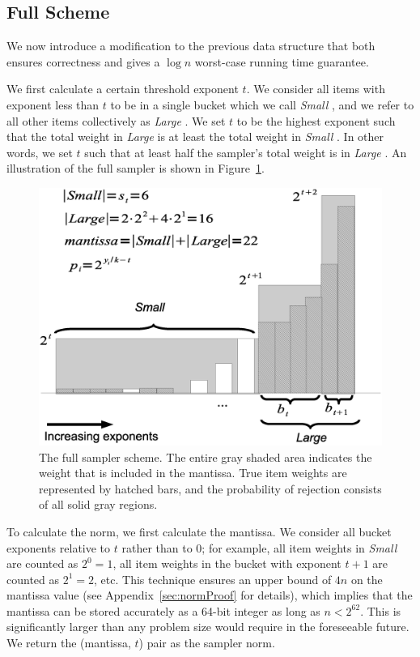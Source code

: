 \documentclass[11pt]{article}
\newcommand{\smallset}{\emph{Small }}
\newcommand{\largeset}{\emph{Large }}
\begin{document}
\subsection{Full Scheme} \label{sec:fullScheme}
We now introduce a modification to the previous data structure that both 
ensures correctness and gives a $\log n$ worst-case running time guarantee.  

We first calculate a certain threshold exponent $t$.  We consider all
items with exponent less than $t$ to be in a single bucket which we call
\smallset, and we refer to all other items collectively as \largeset. We
set $t$ to be the highest exponent such that the total weight in
\largeset is at least the total weight in \smallset.  In other words, we
set $t$ such that at least half the sampler's total weight is in \largeset.  
An illustration of the full sampler is shown in Figure~\ref{fig:fullScheme}.

\begin{figure}[ht]
\centering
\includegraphics[width=6in]{fullScheme.eps}
\caption{The full sampler scheme.  The entire gray shaded area indicates the
  weight that is included in the mantissa. True
  item weights are represented by hatched bars, and the probability of
  rejection  consists of all solid gray regions.} 
\label{fig:fullScheme}
\end{figure}

To calculate the norm, we first calculate the mantissa. We consider all 
bucket exponents relative to $t$ rather than to $0$; for example,
all item weights in \smallset are counted as $2^0=1$, all item weights in the
bucket with exponent $t+1$ are counted as $2^1=2$, etc. This technique 
ensures an upper bound of $4n$ on the mantissa value (see
Appendix~\ref{sec:normProof} for details),  which implies that the mantissa 
can be stored accurately as a 64-bit integer as
long as $ n < 2^{62}$. This is significantly larger than any problem size
would require in the foreseeable future.  We return the (mantissa, $t$) pair 
as the sampler norm.
\end{document}
